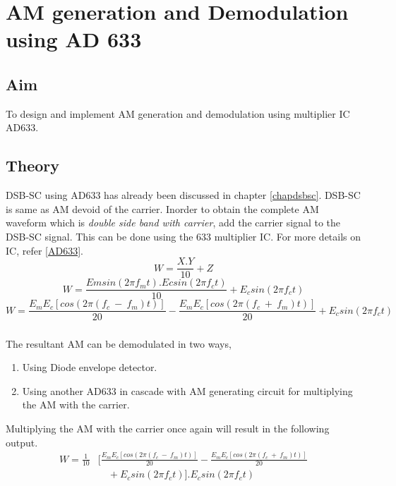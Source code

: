 
\chapter[AM generation and Demodulation using AD 633]{AM generation and Demodulation using AD 633}
\section*{Aim}
To design and implement AM generation and demodulation using multiplier IC AD633.
\section*{Theory}
DSB-SC using AD633 has already been discussed in chapter \ref{chapdsbsc}. DSB-SC is same as AM devoid of the carrier. Inorder to obtain the complete AM waveform which is \emph{double side band with carrier}, add the carrier signal to the DSB-SC signal. This can be done using the 633 multiplier IC. For more details on IC, refer \ref{AD633}.
\begin{equation}
W= \frac{X.Y}{10}+Z
\end{equation}
\begin{equation}
W= \frac{Emsin(2\pi f_mt).Ecsin(2\pi f_ct)}{10}+E_c sin(2\pi f_ct)
\end{equation}
\begin{equation}
W= \frac{E_mE_c [cos (2\pi (f_c\ -\ f_m)t)]}{20}- \frac{E_mE_c[cos (2\pi (f_c\ +\ f_m)t)]}{20}+E_c sin(2\pi f_ct)
\end{equation}

\paragraph{}
	The resultant AM can be demodulated in two ways,
 \begin{enumerate}

\item
Using Diode envelope detector.
\item
Using another AD633 in cascade with AM generating circuit for multiplying the AM with the carrier.
\end{enumerate}

Multiplying the AM with the carrier once again will result in the following output.
\begin{equation}
\begin{split}
W=\frac{1}{10} &[ \frac{E_mE_c [cos (2\pi (f_c\ -\ f_m)t)]}{20}- \frac{E_mE_c[cos (2\pi (f_c\ +\ f_m)t)]}{20}\\
&\quad +E_c sin(2\pi f_ct)].E_c sin(2\pi f_ct)
\end{split}
\end{equation}

